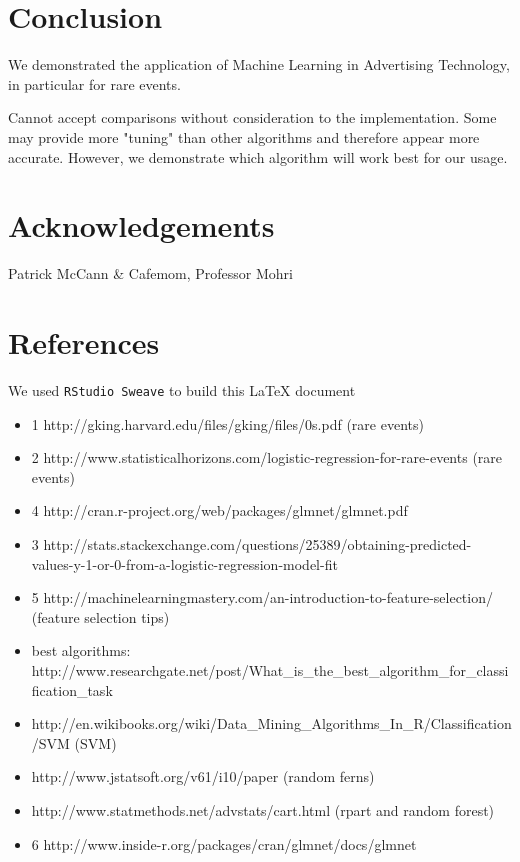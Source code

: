 \documentclass[a4paper]{article}
\begin{document}
\begin{multicols}{2}
\section*{Conclusion}
We demonstrated the application of Machine Learning in Advertising Technology, in particular for rare events.

Cannot accept comparisons without consideration to the implementation. Some may provide more "tuning" than other algorithms and therefore appear more accurate. However, we demonstrate which algorithm will work best for our usage.

\section*{Acknowledgements}
Patrick McCann \& Cafemom, Professor Mohri

\end{multicols}


\section*{References}
We used \texttt{RStudio Sweave} to build this \LaTeX{} document
\begin{itemize}
  \item 1 http://gking.harvard.edu/files/gking/files/0s.pdf (rare events)
  \item 2 http://www.statisticalhorizons.com/logistic-regression-for-rare-events (rare events)
  \item 4 http://cran.r-project.org/web/packages/glmnet/glmnet.pdf
  \item 3 http://stats.stackexchange.com/questions/25389/obtaining-predicted-values-y-1-or-0-from-a-logistic-regression-model-fit
  \item 5 http://machinelearningmastery.com/an-introduction-to-feature-selection/ (feature selection tips)
  \item best algorithms: http://www.researchgate.net/post/What\_is\_the\_best\_algorithm\_for\_classification\_task
  \item http://en.wikibooks.org/wiki/Data\_Mining\_Algorithms\_In\_R/Classification/SVM (SVM)
  \item http://www.jstatsoft.org/v61/i10/paper (random ferns)
  \item http://www.statmethods.net/advstats/cart.html (rpart and random forest)
  \item 6 http://www.inside-r.org/packages/cran/glmnet/docs/glmnet
\end{itemize}
\end{document}
